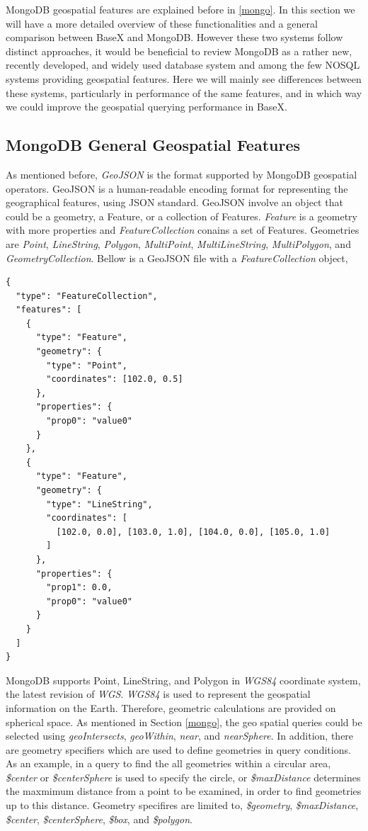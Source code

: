 \documentclass[a4paper,12pt]{article}
\begin{document}
MongoDB geospatial features are explained before in \ref{mongo}. In this section we will have a more detailed overview of these functionalities and a general comparison between BaseX and MongoDB. However these two systems follow distinct approaches, it would be beneficial to review MongoDB as a rather new, recently developed, and widely used database system and among the few NOSQL systems providing geospatial features. Here we will mainly see differences between these systems, particularly in performance of the same features, and in which way we could improve the geospatial querying performance in BaseX. 


\subsection {MongoDB General Geospatial Features}
As mentioned before, \textit{GeoJSON} is the format supported by MongoDB geospatial operators. GeoJSON is a human-readable encoding format for representing the geographical features, using JSON standard. GeoJSON involve an object that could be a geometry, a Feature, or a collection of Features. \textit{Feature} is a geometry with more properties and \textit{FeatureCollection} conains a set of Features. Geometries are \textit{Point}, \textit{LineString}, \textit{Polygon}, \textit{MultiPoint}, \textit{MultiLineString}, \textit{MultiPolygon}, and \textit{GeometryCollection}. Bellow is a GeoJSON file with a \textit{FeatureCollection} object,

\begin{verbatim}
{
  "type": "FeatureCollection",
  "features": [
    {
      "type": "Feature",
      "geometry": {
        "type": "Point",
        "coordinates": [102.0, 0.5]
      },
      "properties": {
        "prop0": "value0"
      }
    },
    {
      "type": "Feature",
      "geometry": {
        "type": "LineString",
        "coordinates": [
          [102.0, 0.0], [103.0, 1.0], [104.0, 0.0], [105.0, 1.0]
        ]
      },
      "properties": {
        "prop1": 0.0,
        "prop0": "value0"
      }
    }
  ]
}
\end{verbatim}

MongoDB supports Point, LineString, and Polygon in \textit{WGS84} coordinate system, the latest revision of \textit{WGS}. \textit{WGS84} is used to represent the geospatial information on the Earth. Therefore, geometric calculations are provided on spherical space. As mentioned in Section \ref{mongo}, the geo spatial queries could be selected using \textit{geoIntersects}, \textit{geoWithin}, \textit{near}, and \textit{nearSphere}. In addition, there are geometry specifiers which are used to define geometries in query conditions. As an example, in a query to find the all geometries within a circular area, \textit{\$center} or \textit{\$centerSphere} is used to specify the circle, or \textit{\$maxDistance} determines the maxmimum distance from a point to be examined, in order to find geometries up to this distance. Geometry specifires are limited to, \textit{\$geometry}, \textit{\$maxDistance}, \textit{\$center}, \textit{\$centerSphere}, \textit{\$box}, and \textit{\$polygon}.
\end{document}
